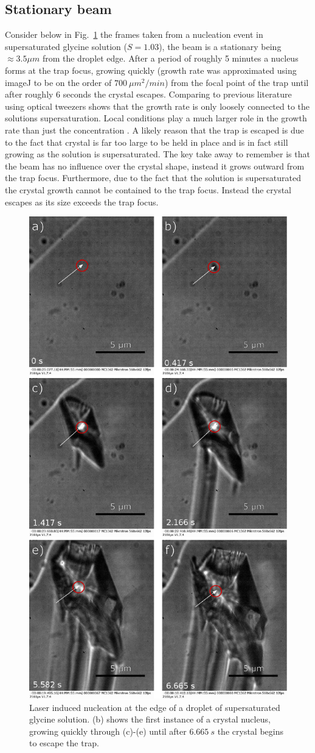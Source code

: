 \subsection{Stationary beam}
\label{sec:stationary}
Consider below in Fig.~\ref{fig:stationary_beam} the frames taken from a nucleation 
event in supersaturated glycine solution ($S=1.03$), the beam is a stationary being 
$\approx3.5 \mu m$ from the droplet edge. After a period of roughly 5 minutes a 
nucleus forms at the trap focus, growing quickly (growth rate was approximated using
imageJ to be on the order of $700\ \mu m^2/min$) from the focal point of the trap 
until after roughly $6$ seconds the crystal escapes. Comparing to previous literature
using optical tweezers shows that the growth rate is only loosely connected to the 
solutions supersaturation. Local conditions play a much larger role in the growth 
rate than just the concentration \cite{Flannigan2023}. A likely reason that the trap 
is escaped is due to the fact that crystal is far too large to be held in place and 
is in fact still growing as the solution is supersaturated. The key take away to 
remember is that the beam has no influence over the crystal shape, instead it 
grows outward from the trap focus. Furthermore, due to the fact that the solution
is supersaturated the crystal growth cannot be contained to the trap focus. Instead 
the crystal escapes as its size exceeds the trap focus. 
\begin{figure}[h!]
	\centering
	\includegraphics[width=0.63\linewidth]{frames_no_beam_movement.pdf}
	\caption{Laser induced nucleation at the edge of a droplet of supersaturated 
	glycine solution. (b) shows the first instance of a crystal nucleus, growing 
	quickly through (c)-(e) until after $6.665\ s$ the crystal begins to escape 
	the trap.}
	\label{fig:stationary_beam}
\end{figure}

